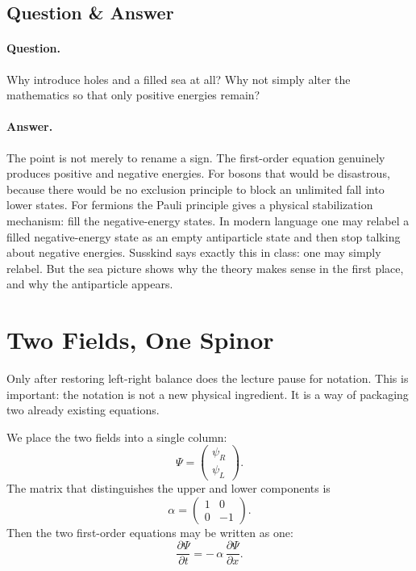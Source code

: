 \subsection{Question \& Answer}

\paragraph{Question.} Why introduce holes and a filled sea at all? Why not simply alter the mathematics so that only positive energies remain?

\paragraph{Answer.} The point is not merely to rename a sign. The first-order equation genuinely produces positive and negative energies. For bosons that would be disastrous, because there would be no exclusion principle to block an unlimited fall into lower states. For fermions the Pauli principle gives a physical stabilization mechanism: fill the negative-energy states. In modern language one may relabel a filled negative-energy state as an empty antiparticle state and then stop talking about negative energies. Susskind says exactly this in class: one may simply relabel. But the sea picture shows why the theory makes sense in the first place, and why the antiparticle appears.

\section{Two Fields, One Spinor}

Only after restoring left-right balance does the lecture pause for notation. This is important: the notation is not a new physical ingredient. It is a way of packaging two already existing equations.

We place the two fields into a single column:
\begin{equation}
\Psi=\begin{pmatrix}\psi_R\\ \psi_L\end{pmatrix}.
\end{equation}
The matrix that distinguishes the upper and lower components is
\begin{equation}
\alpha=\begin{pmatrix}1&0\\0&-1\end{pmatrix}.
\end{equation}
Then the two first-order equations may be written as one:
\begin{equation}
\frac{\partial \Psi}{\partial t}
=
-\,\alpha\,\frac{\partial \Psi}{\partial x}.
\end{equation}

